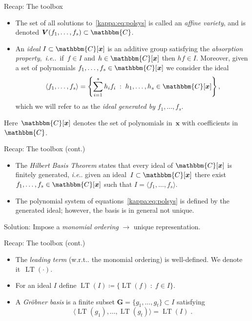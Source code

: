 \documentclass[aspectratio=169]{beamer}
\makeatletter
\newcommand{\C}{\ensuremath{\mathbbm{C}}}
\newcommand{\mat}[1]{\bm{#1}}
\DeclareRobustCommand\ie{\emph{i.e}\@ifnextchar.{}{.\@}}
\DeclareRobustCommand\wrt{w.r.t\@ifnextchar.{}{.\@}}
\DeclareMathOperator{\lt}{LT}
\makeatother
\begin{document}
\begin{frame}{Recap: The toolbox}
\begin{itemize}
\item  The set of all solutions to~\eqref{kappa:eq:polsys} is called an \emph{affine variety}, and is denoted
$\mat{V}(f_1,\ldots,f_s)\subset\C$.
\item An \emph{ideal} $I\subset\C[\mat{x}]$ is an additive group satisfying the \emph{absorption property},~\ie{}~if~$f\in I$ and $h\in\C[\mat{x}]$ then $hf\in I$. Moreover, given a set of polynomials $f_1,\ldots,f_s\in\C[\mat{x}]$
we consider the ideal
\begin{equation*}
\langle f_1,\ldots,f_s\rangle = \left\{\sum_{i=1}^sh_if_i\;:\;h_1,\ldots,h_s\in\C[\mat{x}]\right\},
\end{equation*}
which we will refer to as the \emph{ideal generated by} $f_1,\ldots,f_s$.

\end{itemize}
Here~$\C[\mat{x}]$ denotes the set
of polynomials in~$\mat{x}$ with coefficients in $\C$.
\end{frame}


\begin{frame}{Recap: The toolbox (cont.)}

\begin{itemize}
\item The \emph{Hilbert Basis Theorem} states that every ideal of $\C[\mat{x}]$ is
finitely generated, \ie{} given an ideal~$I\subset\C[\mat{x}]$ there exist
$f_1,\ldots,f_s\in\C[\mat{x}]$ such that $I=\langle f_1,\ldots,f_s\rangle$.
\item The polynomial system of equations~\eqref{kappa:eq:polsys} is defined by the
generated ideal; however, the basis is in general not unique.
\end{itemize}

\alert{Solution}: Impose a \emph{monomial ordering} $\longrightarrow$ unique representation.
\end{frame}

\begin{frame}{Recap: The toolbox (cont.)}

\begin{itemize}
\item The \emph{leading term} (\wrt{} the monomial ordering) is well-defined. We denote it~$\lt(\cdot)$.
\item For an ideal $I$ define $\lt(I)\coloneqq\{\lt(f)\;:\;f\in I\}$.
\item A \emph{Gröbner basis} is a finite subset \mbox{$\mat{G}=\{g_1,\ldots,g_t\}\subset I$}
satisfying
\begin{equation*}
    \langle\lt(g_1),\ldots,\lt(g_t)\rangle=\lt(I)\;.
\end{equation*}
\end{itemize}
\end{frame}
\end{document}
